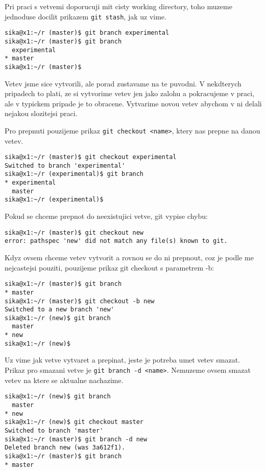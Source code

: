 \documentclass[12pt,a5paper]{article}
\begin{document}
Pri praci s vetvemi doporucuji mit cisty working directory, toho muzeme jednoduse docilit prikazem \lstinline|git stash|, jak uz vime.

\begin{lstlisting}
sika@x1:~/r (master)$ git branch experimental
sika@x1:~/r (master)$ git branch
  experimental
* master
sika@x1:~/r (master)$
\end{lstlisting}

Vetev jsme sice vytvorili, ale porad zustavame na te puvodni. V nekdterych pripadech to plati, ze si vytvorime vetev jen jako zalohu a pokracujeme v praci, ale v typickem pripade je to obracene. Vytvarime novou vetev abychom v ni delali nejakou slozitejsi praci.

Pro prepnuti pouzijeme prikaz \lstinline|git checkout <name>|, ktery nas prepne na danou vetev.

\begin{lstlisting}
sika@x1:~/r (master)$ git checkout experimental
Switched to branch 'experimental'
sika@x1:~/r (experimental)$ git branch
* experimental
  master
sika@x1:~/r (experimental)$
\end{lstlisting}

Pokud se chceme prepnot do neexistujici vetve, git vypise chybu:

\begin{lstlisting}
sika@x1:~/r (master)$ git checkout new
error: pathspec 'new' did not match any file(s) known to git.
\end{lstlisting}

Kdyz ovsem chceme vetev vytvorit a rovnou se do ni prepnout, coz je podle me nejcastejsi pouziti, pouzijeme prikaz git checkout s parametrem -b:

\begin{lstlisting}
sika@x1:~/r (master)$ git branch
* master
sika@x1:~/r (master)$ git checkout -b new
Switched to a new branch 'new'
sika@x1:~/r (new)$ git branch
  master
* new
sika@x1:~/r (new)$
\end{lstlisting}

Uz vime jak vetve vytvaret a prepinat, jeste je potreba umet vetev smazat. Prikaz pro smazani vetve je \lstinline|git branch -d <name>|. Nemuzeme ovsem smazat vetev na ktere se aktualne nachazime.

\begin{lstlisting}
sika@x1:~/r (new)$ git branch
  master
* new
sika@x1:~/r (new)$ git checkout master
Switched to branch 'master'
sika@x1:~/r (master)$ git branch -d new
Deleted branch new (was 3a612f1).
sika@x1:~/r (master)$ git branch
* master
\end{lstlisting}
\end{document}
